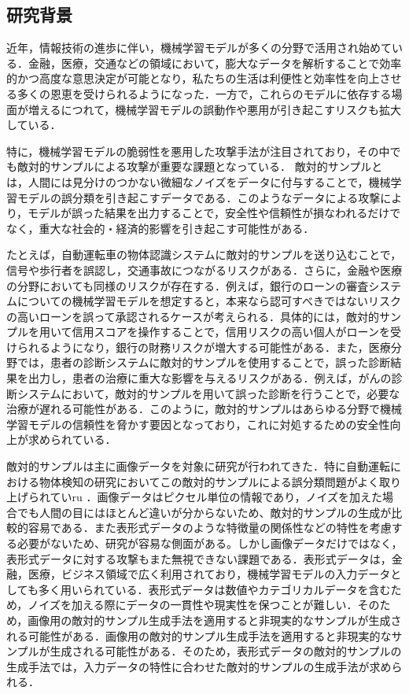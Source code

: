 \subsection{研究背景}
近年，情報技術の進歩に伴い，機械学習モデルが多くの分野で活用され始めている．金融，医療，交通などの領域において，膨大なデータを解析することで効率的かつ高度な意思決定が可能となり，私たちの生活は利便性と効率性を向上させる多くの恩恵を受けられるようになった．一方で，これらのモデルに依存する場面が増えるにつれて，機械学習モデルの誤動作や悪用が引き起こすリスクも拡大している．

特に，機械学習モデルの脆弱性を悪用した攻撃手法が注目されており，その中でも敵対的サンプルによる攻撃が重要な課題となっている\cite{MBSD-AdversarialTraining}．
敵対的サンプルとは，人間には見分けのつかない微細なノイズをデータに付与することで，機械学習モデルの誤分類を引き起こすデータである\cite{MBSD-AdversarialExample}．このようなデータによる攻撃により，モデルが誤った結果を出力することで，安全性や信頼性が損なわれるだけでなく，重大な社会的・経済的影響を引き起こす可能性がある．

たとえば，自動運転車の物体認識システムに敵対的サンプルを送り込むことで，信号や歩行者を誤認し，交通事故につながるリスクがある\cite{AdversarialMachineLearning:BayesianPerspectives}．さらに，金融や医療の分野においても同様のリスクが存在する．例えば，銀行のローンの審査システムについての機械学習モデルを想定すると，本来なら認可すべきではないリスクの高いローンを誤って承認されるケースが考えられる．具体的には，敵対的サンプルを用いて信用スコアを操作することで，信用リスクの高い個人がローンを受けられるようになり，銀行の財務リスクが増大する可能性がある．また，医療分野では，患者の診断システムに敵対的サンプルを使用することで，誤った診断結果を出力し，患者の治療に重大な影響を与えるリスクがある．例えば，がんの診断システムにおいて，敵対的サンプルを用いて誤った診断を行うことで，必要な治療が遅れる可能性がある．このように，敵対的サンプルはあらゆる分野で機械学習モデルの信頼性を脅かす要因となっており，これに対処するための安全性向上が求められている．

敵対的サンプルは主に画像データを対象に研究が行われてきた．特に自動運転における物体検知の研究においてこの敵対的サンプルによる誤分類問題がよく取り上げられていru
\cite{MBSD-automobile}．画像データはピクセル単位の情報であり，ノイズを加えた場合でも人間の目にはほとんど違いが分からないため、敵対的サンプルの生成が比較的容易である．また表形式データのような特徴量の関係性などの特性を考慮する必要がないため、研究が容易な側面がある。しかし画像データだけではなく，表形式データに対する攻撃もまた無視できない課題である．表形式データは，金融，医療，ビジネス領域で広く利用されており，機械学習モデルの入力データとしても多く用いられている．表形式データは数値やカテゴリカルデータを含むため，ノイズを加える際にデータの一貫性や現実性を保つことが難しい．そのため，画像用の敵対的サンプル生成手法を適用すると非現実的なサンプルが生成される可能性がある．画像用の敵対的サンプル生成手法を適用すると非現実的なサンプルが生成される可能性がある．そのため，表形式データの敵対的サンプルの生成手法では，入力データの特性に合わせた敵対的サンプルの生成手法が求められる．

